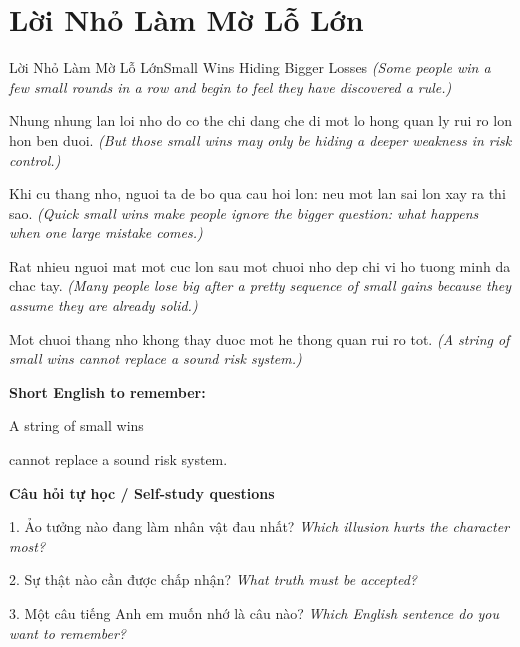 \section{Lời Nhỏ Làm Mờ Lỗ Lớn}
\begin{truyen}{Lời Nhỏ Làm Mờ Lỗ Lớn}{Small Wins Hiding Bigger Losses}
\textit{(Some people win a few small rounds in a row and begin to feel they have discovered a rule.)}

Nhung nhung lan loi nho do co the chi dang che di mot lo hong quan ly rui ro lon hon ben duoi.
\textit{(But those small wins may only be hiding a deeper weakness in risk control.)}

Khi cu thang nho, nguoi ta de bo qua cau hoi lon: neu mot lan sai lon xay ra thi sao.
\textit{(Quick small wins make people ignore the bigger question: what happens when one large mistake comes.)}

Rat nhieu nguoi mat mot cuc lon sau mot chuoi nho dep chi vi ho tuong minh da chac tay.
\textit{(Many people lose big after a pretty sequence of small gains because they assume they are already solid.)}

\end{truyen}

\begin{baihoc}
Mot chuoi thang nho khong thay duoc mot he thong quan rui ro tot.
\textit{(A string of small wins cannot replace a sound risk system.)}
\end{baihoc}

\begin{ghinhoanh}
\textbf{Short English to remember:}

A string of small wins

cannot replace a sound risk system.

\end{ghinhoanh}

\begin{tuhocnhanh}
\textbf{Câu hỏi tự học / Self-study questions}

1. Ảo tưởng nào đang làm nhân vật đau nhất? \textit{Which illusion hurts the character most?}

2. Sự thật nào cần được chấp nhận? \textit{What truth must be accepted?}

3. Một câu tiếng Anh em muốn nhớ là câu nào? \textit{Which English sentence do you want to remember?}
\end{tuhocnhanh}
\ngancach

